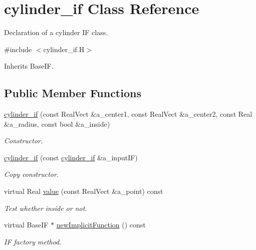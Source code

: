 \hypertarget{classcylinder__if}{}\section{cylinder\+\_\+if Class Reference}
\label{classcylinder__if}


Declaration of a cylinder IF class.  




{\ttfamily \#include $<$cylinder\+\_\+if.\+H$>$}



Inherits Base\+IF.

\subsection*{Public Member Functions}
\begin{DoxyCompactItemize}
\item 
\hyperlink{classcylinder__if_af5ba2824b559e1931278bb3526695dbc}{cylinder\+\_\+if} (const Real\+Vect \&a\+\_\+center1, const Real\+Vect \&a\+\_\+center2, const Real \&a\+\_\+radius, const bool \&a\+\_\+inside)
\begin{DoxyCompactList}\small\item\em Constructor. \end{DoxyCompactList}\item 
\hyperlink{classcylinder__if_a32298207dbcd1d2270fc2473f72fb9ec}{cylinder\+\_\+if} (const \hyperlink{classcylinder__if}{cylinder\+\_\+if} \&a\+\_\+input\+IF)
\begin{DoxyCompactList}\small\item\em Copy constructor. \end{DoxyCompactList}\item 
virtual Real \hyperlink{classcylinder__if_a221fddfca92fbcfe5062d1e69148e930}{value} (const Real\+Vect \&a\+\_\+point) const 
\begin{DoxyCompactList}\small\item\em Test whether inside or not. \end{DoxyCompactList}\item 
virtual Base\+IF $\ast$ \hyperlink{classcylinder__if_acfe8be8075c3de3d9378ad5ef76c5600}{new\+Implicit\+Function} () const 
\begin{DoxyCompactList}\small\item\em IF factory method. \end{DoxyCompactList}\end{DoxyCompactItemize}

